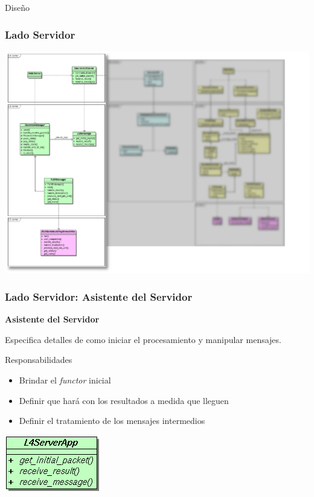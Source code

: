 \begin{subsection}{Diseño}
\begin{frame}
\end{frame}



\begin{frame}\frametitle{Lado Servidor}
    \begin{center}
        \includegraphics[scale=0.25]{images/class-server-side.png}
    \end{center}
\end{frame}

\begin{frame}\frametitle{Lado Servidor: Asistente del Servidor}%

    \textbf{Asistente del Servidor}

    Especifica detalles de como iniciar el procesamiento y manipular mensajes.

    \begin{block}{Responsabilidades}
        \begin{itemize}
            \item   Brindar el \textit{functor} inicial
            \item   Definir que hará con los resultados a medida que lleguen
            \item   Definir el tratamiento de los mensajes intermedios %
        \end{itemize}
    \end{block}

    \begin{center}
        \includegraphics[scale=0.4]{images/l4_server_app.png}
    \end{center}


\end{frame}
\end{subsection}
